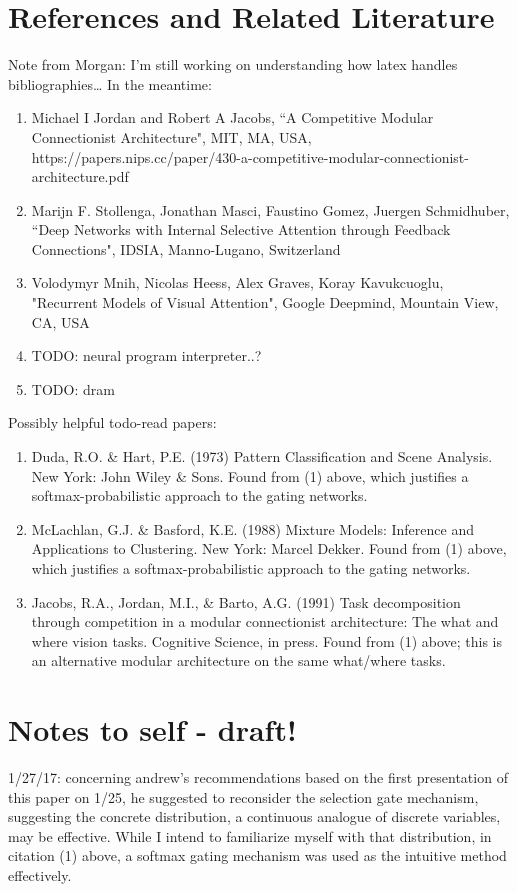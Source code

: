 \documentclass[12pt]{article}
\begin{document}
\section{References and Related Literature}\label{Related Literature // Bibliography}



Note from Morgan: I'm still working on understanding how latex handles bibliographies\ldots
In the meantime: 
\begin{enumerate}
\item 	Michael I Jordan and Robert A Jacobs, ``A Competitive Modular Connectionist Architecture", MIT, MA, USA, https://papers.nips.cc/paper/430-a-competitive-modular-connectionist-architecture.pdf
\item 	Marijn F. Stollenga, Jonathan Masci, Faustino Gomez, Juergen Schmidhuber, ``Deep Networks with Internal Selective Attention through Feedback Connections", IDSIA, Manno-Lugano, Switzerland
\item 	Volodymyr Mnih, Nicolas Heess, Alex Graves, Koray Kavukcuoglu, "Recurrent Models of Visual Attention", Google Deepmind, Mountain View, CA, USA
\item	TODO: neural program interpreter..?
\item	TODO: dram
\end{enumerate}
Possibly helpful todo-read papers:
\begin{enumerate}[resume]
	\item Duda, R.O. \& Hart, P.E. (1973) Pattern Classification and Scene Analysis. New York: John Wiley \& Sons.  Found from (1) above, which justifies a softmax-probabilistic approach to the gating networks.
	\item McLachlan, G.J. \& Basford, K.E. (1988) Mixture Models: Inference and Applications to Clustering. New York: Marcel Dekker.  Found from (1) above, which justifies a softmax-probabilistic approach to the gating networks.
	\item Jacobs, R.A., Jordan, M.I., \& Barto, A.G. (1991) Task decomposition through competition in a modular connectionist architecture: The what and where vision tasks. Cognitive Science, in press.  Found from (1) above; this is an alternative modular architecture on the same what/where tasks.
\end{enumerate}

\section{Notes to self - draft!}
\par 1/27/17: concerning andrew's recommendations based on the first presentation of this paper on 1/25, he suggested to reconsider the selection gate mechanism, suggesting the concrete distribution, a continuous analogue of discrete variables, may be effective.  While I intend to familiarize myself with that distribution, in citation (1) above, a softmax gating mechanism was used as the intuitive method effectively.
\end{document}
